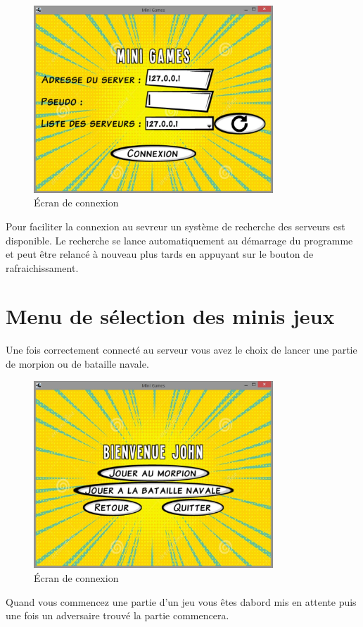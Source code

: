 \documentclass{report}
\begin{document}
\begin{figure}[H]
	\centering\includegraphics[width=9cm]{loginScreen}
	\caption{Écran de connexion}
\end{figure}

Pour faciliter la connexion au sevreur un système de recherche des serveurs est disponible. Le recherche se lance
automatiquement au démarrage du programme et peut être relancé à nouveau plus tards en appuyant sur le bouton de rafraichissament.


\chapter{Menu de sélection des minis jeux}
Une fois correctement connecté au serveur vous avez le choix de lancer une partie de morpion ou de bataille navale.
\begin{figure}[H]
	\centering\includegraphics[width=9cm]{MenuJeux}
	\caption{Écran de connexion}
\end{figure}

Quand vous commencez une partie d'un jeu vous êtes dabord mis en attente puis
une fois un adversaire trouvé la partie commencera.
\end{document}
